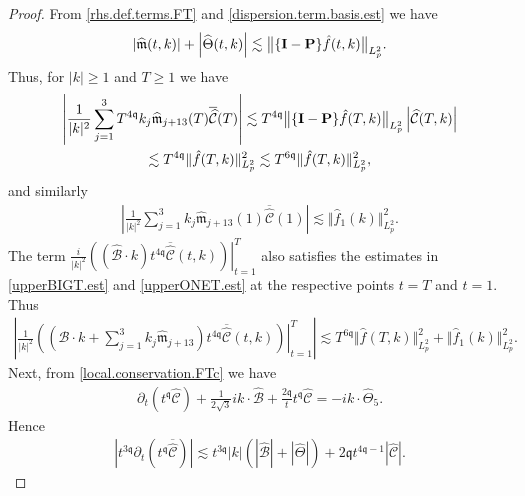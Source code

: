\documentclass[reqno]{amsart}
\newcommand{\pv}{p}
\def\norm#1{\big\Vert#1\big\Vert}
\newcommand{\qq}{\mathfrak{q}}
\newcommand{\tq}{t^{\qq}}
\newcommand{\tTq}{t^{3\qq}}
\newcommand{\micro}{{\bf \{I- P\}}}
\newcommand{\highG}{\Theta}
\theoremstyle{definition}
\numberwithin{equation}{section}
\numberwithin{theorem}{section}
\begin{document}
\begin{proof}
From \eqref{rhs.def.terms.FT} and \eqref{dispersion.term.basis.est} we have 
\begin{align}\label{mTH.est}
\left| \widehat{\mathfrak{m}}(t,k)\right|
+
\left| \widehat{\highG}(t,k)\right|
 \lesssim 
\norm{\micro \hat{f}(t,k)}_{L^2_{\pv}}.
\end{align}
Thus, for $|k|\ge 1$ and $T \ge 1$ we have 
\begin{multline}\label{upperBIGT.est}
    \left| \frac{1}{|k|^2} \sum_{j=1}^3 
 T^{4\qq}  k_j\widehat{\mathfrak{m}}_{j+13} (T) \overline{\widehat{\mathcal{C}}}(T)\right|
 \lesssim  
 T^{4\qq}\norm{\micro \hat{f}(T,k)}_{L^2_{\pv}} \left|\widehat{\mathcal{C}}(T,k)\right|
 \\
  \lesssim  
 T^{4\qq}\Vert \hat{f}(T,k)\Vert_{L^2_{\pv}}^2
   \lesssim 
 T^{6\qq}\Vert \hat{f}(T,k)\Vert_{L^2_{\pv}}^2,
\end{multline}
and similarly 
\begin{align}\label{upperONET.est}
    \left| \frac{1}{|k|^2} \sum_{j=1}^3 
   k_j\widehat{\mathfrak{m}}_{j+13} (1) \overline{\widehat{\mathcal{C}}}(1)\right|
 \lesssim  
\norm{ \hat{f}_1(k)}_{L^2_{\pv}}^2.
\end{align}
The term  
$\left. \frac{i}{|k|^2} \left( \left( \widehat{\mathcal{B}}\cdot k  \right)t^{4\qq}\overline{\widehat{\mathcal{C}}}(t,k) \right)\right|_{t=1}^T$ also satisfies the estimates in \eqref{upperBIGT.est} and \eqref{upperONET.est} at the respective points $t=T$ and $t=1$.  Thus 
\begin{align*}
    \left|
\left. \frac{1}{|k|^2} \left( \left( \widehat{\mathcal{B}}\cdot k +\sum_{j=1}^3 k_j   \widehat{\mathfrak{m}}_{j+13} \right)t^{4\qq}\overline{\widehat{\mathcal{C}}}(t,k) \right)\right|_{t=1}^T
\right|
\lesssim
 T^{6\qq}\Vert \hat{f}(T,k)\Vert_{L^2_{\pv}}^2
 +
 \norm{ \hat{f}_1(k)}_{L^2_{\pv}}^2.
\end{align*}
Next, from \eqref{local.conservation.FTc} we have
\begin{align*}
    \partial_t\left( \tq \widehat{\mathcal{C}} \right)
  +
\frac{1}{2\sqrt{3}}   ik \cdot \widehat{\mathcal{B}}
+
\frac{2\qq }{t} \tq\widehat{\mathcal{C}}
=- ik \cdot \widehat{\highG}_{5}.
\end{align*}
Hence
\begin{align}\label{usingqleq1}
  \left|  \tTq \partial_t\left(\tq\overline{\widehat{\mathcal{C}}}\right) \right|
 \lesssim 
\tTq |k| \left( \left|\widehat{\mathcal{B}}\right|+\left| \widehat{\highG}\right| \right)
+
2\qq  t^{4\qq -1}\left|\widehat{\mathcal{C}}\right|.
\end{align}

\end{proof}
\end{document}

